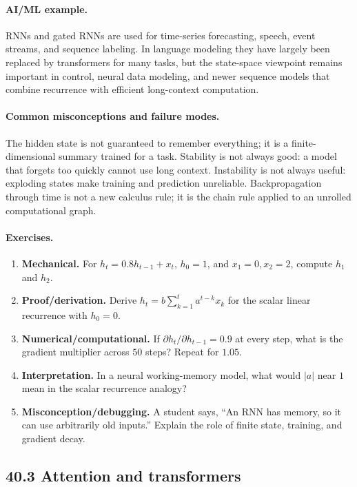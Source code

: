 \paragraph{AI/ML example.}
RNNs and gated RNNs are used for time-series forecasting, speech, event streams, and sequence labeling. In language modeling they have largely been replaced by transformers for many tasks, but the state-space viewpoint remains important in control, neural data modeling, and newer sequence models that combine recurrence with efficient long-context computation.

\paragraph{Common misconceptions and failure modes.}
The hidden state is not guaranteed to remember everything; it is a finite-dimensional summary trained for a task. Stability is not always good: a model that forgets too quickly cannot use long context. Instability is not always useful: exploding states make training and prediction unreliable. Backpropagation through time is not a new calculus rule; it is the chain rule applied to an unrolled computational graph.

\paragraph{Exercises.}
\begin{enumerate}[label=\textbf{40.2.\arabic*.}, leftmargin=*]
\item \textbf{Mechanical.} For \(h_t=0.8h_{t-1}+x_t\), \(h_0=1\), and \(x_1=0,x_2=2\), compute \(h_1\) and \(h_2\).
\item \textbf{Proof/derivation.} Derive \(h_t=b\sum_{k=1}^{t}a^{t-k}x_k\) for the scalar linear recurrence with \(h_0=0\).
\item \textbf{Numerical/computational.} If \(\partial h_t/\partial h_{t-1}=0.9\) at every step, what is the gradient multiplier across \(50\) steps? Repeat for \(1.05\).
\item \textbf{Interpretation.} In a neural working-memory model, what would \(|a|\) near \(1\) mean in the scalar recurrence analogy?
\item \textbf{Misconception/debugging.} A student says, ``An RNN has memory, so it can use arbitrarily old inputs.'' Explain the role of finite state, training, and gradient decay.
\end{enumerate}

\subsection{40.3 Attention and transformers}

